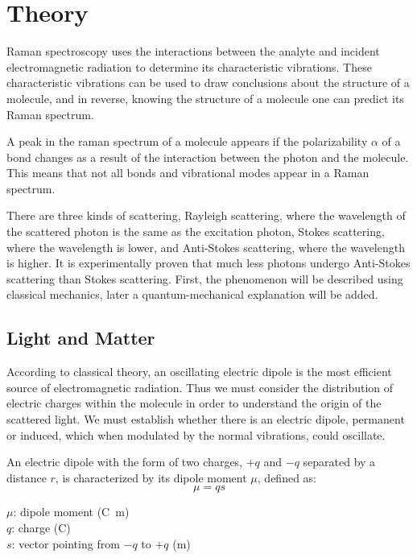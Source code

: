 \section{Theory}

Raman spectroscopy uses the interactions between the analyte and incident electromagnetic radiation to determine its characteristic vibrations. These characteristic vibrations can be used to draw conclusions about the structure of a molecule, and in reverse, knowing the structure of a molecule one can predict its Raman spectrum. 
\bigskip

A peak in the raman spectrum of a molecule appears if the polarizability \( \alpha \) of a bond changes as a result of the interaction between the photon and the molecule. This means that not all bonds and vibrational modes appear in a Raman spectrum. 

\bigskip

There are three kinds of scattering, Rayleigh scattering, where the wavelength of the scattered photon is the same as the excitation photon, Stokes scattering, where the wavelength is lower, and Anti-Stokes scattering, where the wavelength is higher. It is experimentally proven that much less photons undergo Anti-Stokes scattering than Stokes scattering.
First, the phenomenon will be described using classical mechanics, later a quantum-mechanical explanation will be added. 


\subsection{Light and Matter}

According to classical theory, an oscillating electric dipole is the most efficient source of electromagnetic radiation. Thus we must consider the distribution of electric charges within the molecule in order to understand the origin of the scattered light. We must establish whether there is an electric dipole, permanent or induced, which when modulated by the normal vibrations, could oscillate.

\bigskip
An electric dipole with the form of two charges, \(+q\) and \(-q\) separated by a distance \(r\), is characterized by its dipole moment \(\mu\), defined as:
\begin{equation}
    \mu=qs
\end{equation}

\(\mu\): dipole moment (\unit{\coulomb\meter})\\
\(q\): charge (\unit{\coulomb})\\
\(s\): vector pointing from \(-q\) to \(+q\) (\unit{\meter})

